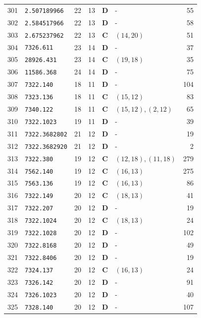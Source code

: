 \documentclass[11pt,a4paper]{article}
\begin{document}
\begin{small}
\begin{longtable}{r l c c c l r}
301 & \texttt{2.507189966} & 22 & 13 & \textbf{D} & - & 55 \\
302 & \texttt{2.584517966} & 22 & 13 & \textbf{D} & - & 58 \\
303 & \texttt{2.675237962} & 22 & 13 & \textbf{C} & $(14,20)$ & 51 \\
304 & \texttt{7326.611} & 23 & 14 & \textbf{D} & - & 37 \\
305 & \texttt{28926.431} & 23 & 14 & \textbf{C} & $(19,18)$ & 35 \\
306 & \texttt{11586.368} & 24 & 14 & \textbf{D} & - & 75 \\
307 & \texttt{7322.140} & 18 & 11 & \textbf{D} & - & 104 \\
308 & \texttt{7323.136} & 18 & 11 & \textbf{C} & $(15,12)$ & 83 \\
309 & \texttt{7340.122} & 18 & 11 & \textbf{C} & $(15,12), (2,12)$ & 65 \\
310 & \texttt{7322.1023} & 19 & 11 & \textbf{D} & - & 39 \\
311 & \texttt{7322.3682802} & 21 & 12 & \textbf{D} & - & 19 \\
312 & \texttt{7322.3682920} & 21 & 12 & \textbf{D} & - & 2 \\
313 & \texttt{7322.380} & 19 & 12 & \textbf{C} & $(12,18), (11,18)$ & 279 \\
314 & \texttt{7562.140} & 19 & 12 & \textbf{C} & $(16,13)$ & 275 \\
315 & \texttt{7563.136} & 19 & 12 & \textbf{C} & $(16,13)$ & 86 \\
316 & \texttt{7322.149} & 20 & 12 & \textbf{C} & $(18,13)$ & 41 \\
317 & \texttt{7322.207} & 20 & 12 & \textbf{D} & - & 19 \\
318 & \texttt{7322.1024} & 20 & 12 & \textbf{C} & $(18,13)$ & 24 \\
319 & \texttt{7322.1028} & 20 & 12 & \textbf{D} & - & 102 \\
320 & \texttt{7322.8168} & 20 & 12 & \textbf{D} & - & 49 \\
321 & \texttt{7322.8406} & 20 & 12 & \textbf{D} & - & 19 \\
322 & \texttt{7324.137} & 20 & 12 & \textbf{C} & $(16,13)$ & 24 \\
323 & \texttt{7326.142} & 20 & 12 & \textbf{D} & - & 91 \\
324 & \texttt{7326.1023} & 20 & 12 & \textbf{D} & - & 40 \\
325 & \texttt{7328.140} & 20 & 12 & \textbf{D} & - & 107 \\

\end{longtable}
\end{small}
\end{document}
